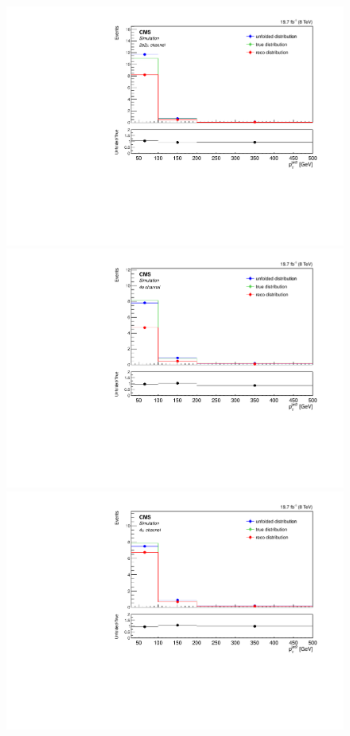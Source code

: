 \begin{figure}[hbtp]
\begin{center}
    \includegraphics[width=0.8\cmsFigWidth]{Figures/Unfolding/MCTests/PtJet2_ZZTo2e2m_MadMatrix_PowDistr_FullSample_fr}
     \includegraphics[width=0.8\cmsFigWidth]{Figures/Unfolding/MCTests/PtJet2_ZZTo4e_PowMatrix_MadDistr_FullSample_fr}     
    \includegraphics[width=0.8\cmsFigWidth]{Figures/Unfolding/MCTests/PtJet2_ZZTo4m_PowMatrix_MadDistr_FullSample_fr}     

\end{center}
\end{figure}
